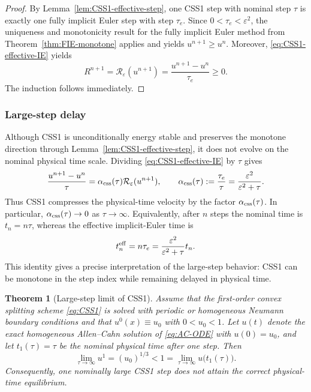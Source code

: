 \documentclass[final, 3p, times]{elsarticle}%
\newcommand{\eps}{\varepsilon}
\newcommand{\Reps}{\mathcal R_\varepsilon}
\newtheorem{theorem}{Theorem}[section]
\begin{document}
\begin{proof}
By Lemma~\ref{lem:CSS1-effective-step}, one CSS1 step with nominal step $\tau$ is exactly
one fully implicit Euler step with step $\tau_e$. Since $0<\tau_e<\eps^2$,
the uniqueness and monotonicity result for the fully implicit Euler method from Theorem~\ref{thm:FIE-monotone} applies and yields $u^{n+1}\ge u^n$.
Moreover, \eqref{eq:CSS1-effective-IE} yields
\[
    R^{n+1}=\Reps(u^{n+1})=\frac{u^{n+1}-u^n}{\tau_e}\ge0.
\]
The induction follows immediately.
\end{proof}

\subsubsection{Large-step delay}

Although CSS1 is unconditionally energy stable and preserves the monotone direction through Lemma~\ref{lem:CSS1-effective-step}, it does not evolve on the nominal physical time scale. Dividing \eqref{eq:CSS1-effective-IE} by $\tau$ gives
\begin{equation}
    \frac{u^{n+1}-u^n}{\tau} =
    \alpha_{\rm css}(\tau)\Reps(u^{n+1}),
    \qquad
    \alpha_{\rm css}(\tau):=\frac{\tau_e}{\tau}
    =\frac{\eps^2}{\eps^2+\tau}.
    \label{eq:CSS1-slope-compression}
\end{equation}
Thus CSS1 compresses the physical-time velocity by the factor $\alpha_{\rm css}(\tau)$. In particular, $\alpha_{\rm css}(\tau)\to0$ as $\tau\to\infty$. Equivalently, after $n$ steps the nominal time is $t_n=n\tau$, whereas the effective implicit-Euler time is
\begin{equation}
    t_n^{\rm eff}=n\tau_e
    =\frac{\eps^2}{\eps^2+\tau}t_n .
    \label{eq:CSS1-effective-time}
\end{equation}
This identity gives a precise interpretation of the large-step behavior: CSS1 can be monotone in the step index while remaining delayed in physical time.


\begin{theorem}[Large-step limit of CSS1]
\label{thm:CSS1-large-step-limit}
Assume that the first-order convex splitting scheme \eqref{eq:CSS1} is solved with periodic or homogeneous Neumann boundary conditions and that
$u^0(x)\equiv u_0$ with $0<u_0<1$. Let
\(u(t)\) denote the exact homogeneous Allen--Cahn solution of
\eqref{eq:AC-ODE} with \(u(0)=u_0\), and let \(t_1(\tau)=\tau\) be the
nominal physical time after one step. Then
\begin{equation}
    \lim_{\tau\to\infty}u^1
    =(u_0)^{1/3}<1
    =\lim_{\tau\to\infty}u\bigl(t_1(\tau)\bigr).
    \label{eq:CSS1-large-step-limit}
\end{equation}
Consequently, one nominally large CSS1 step does not attain the correct
physical-time equilibrium.
\end{theorem}
\end{document}
